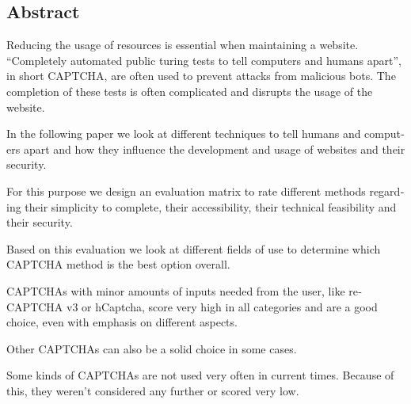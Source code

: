 

\begin{otherlanguage}{american}
	\chapter*{Abstract}
	Reducing the usage of resources is essential when maintaining a website. 
	“Completely automated public turing tests to tell computers and humans apart”, in short CAPTCHA, are often used to prevent attacks from malicious bots. 
	The completion of these tests is often complicated and disrupts the usage of the website. 

	In the following paper we look at different techniques to tell humans and computers apart and how they influence the development and usage of websites and their security. 
	
	For this purpose we design an evaluation matrix to rate different methods regarding their simplicity to complete, their accessibility, their technical feasibility and their security. 
	
	Based on this evaluation we look at different fields of use to determine which CAPTCHA method is the best option overall.

	CAPTCHAs with minor amounts of inputs needed from the user, like reCAPTCHA v3 or hCaptcha, score very high in all categories and are a good choice,
	even with emphasis on different aspects.  

	Other CAPTCHAs can also be a solid choice in some cases.

	Some kinds of CAPTCHAs are not used very often in current times. 
	Because of this, they weren't considered any further or scored very low.

\end{otherlanguage}
